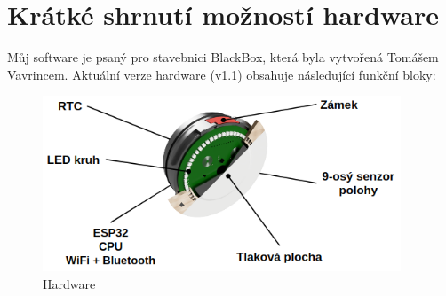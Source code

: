 \newpage
\chapter{Krátké shrnutí možností hardware}
Můj software je psaný pro stavebnici BlackBox, která byla vytvořená Tomášem Vavrincem. 
Aktuální verze hardware (v1.1) obsahuje následující funkční bloky:

\begin{figure}
    \begin{small}
        \begin{center}
            \includegraphics[width=0.95\textwidth]{img/hardware.png}
        \end{center}
        \caption{Hardware}
        \label{fig:hardware}
    \end{small}
\end{figure}

